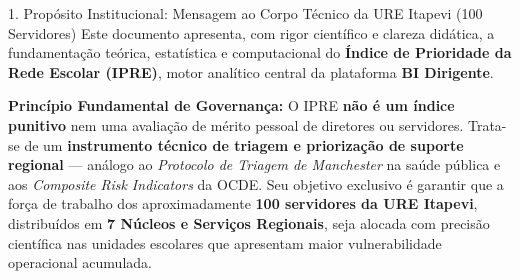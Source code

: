 \documentclass[9pt,a4paper]{extarticle}
\begin{document}
\vspace{0.2cm}

\begin{execbox}{1. Propósito Institucional: Mensagem ao Corpo Técnico da URE Itapevi (100 Servidores)}
Este documento apresenta, com rigor científico e clareza didática, a fundamentação teórica, estatística e computacional do \textbf{Índice de Prioridade da Rede Escolar (IPRE)}, motor analítico central da plataforma \textbf{BI Dirigente}.

\textbf{Princípio Fundamental de Governança:} O IPRE \textbf{não é um índice punitivo} nem uma avaliação de mérito pessoal de diretores ou servidores. Trata-se de um \textbf{instrumento técnico de triagem e priorização de suporte regional} --- análogo ao \emph{Protocolo de Triagem de Manchester} na saúde pública e aos \emph{Composite Risk Indicators} da OCDE. Seu objetivo exclusivo é garantir que a força de trabalho dos aproximadamente \textbf{100 servidores da URE Itapevi}, distribuídos em \textbf{7 Núcleos e Serviços Regionais}, seja alocada com precisão científica nas unidades escolares que apresentam maior vulnerabilidade operacional acumulada.
\end{execbox}

\vspace{0.15cm}
\tableofcontents

\newpage
\end{document}
